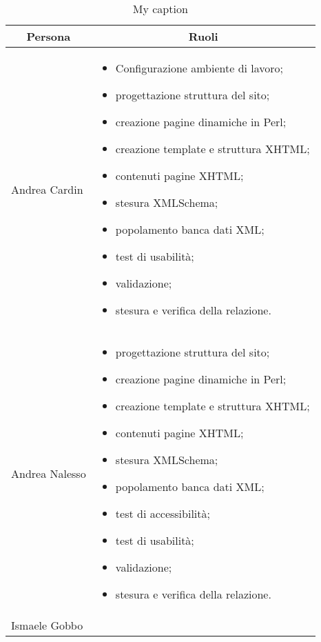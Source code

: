 \begin{table}[H]
	\centering
	\caption{My caption}
	\label{my-label}
	\begin{tabular}{|l|p{}|}
		\hline
		\multicolumn{1}{|c|}{\textbf{Persona}} & \multicolumn{1}{c|}{\textbf{Ruoli}}                   \\ \hline
\multicolumn{1}{|l|}{\rule{0pt}{4ex} Andrea Cardin}  & \multicolumn{1}{p{0.55\textwidth}|}{ \begin{itemize}
			\setlength{\itemsep}{0pt}
			\setlength{\parskip}{0pt}
			\setlength{\parsep}{0pt} 
			\item Configurazione ambiente di lavoro;
			\item progettazione struttura del sito;
			\item creazione pagine dinamiche in Perl;
			\item creazione template e struttura XHTML;
			\item contenuti pagine XHTML;
			\item stesura XMLSchema;
			\item popolamento banca dati XML;
			\item test di usabilità;
			\item validazione;
			\item stesura e verifica della relazione.
		\end{itemize} } \\ \hline
\multicolumn{1}{|l|}{\rule{0pt}{4ex} Andrea Nalesso} & \multicolumn{1}{p{0.55\textwidth}|}{
	\begin{itemize}
		\setlength{\itemsep}{0pt}
		\setlength{\parskip}{0pt}
		\setlength{\parsep}{0pt} 
		\item progettazione struttura del sito;
		\item creazione pagine dinamiche in Perl;
		\item creazione template e struttura XHTML;
		\item contenuti pagine XHTML;
		\item stesura XMLSchema;
		\item popolamento banca dati XML;
		\item test di accessibilità;
		\item test di usabilità;
		\item validazione;
		\item stesura e verifica della relazione.
	\end{itemize}} \\ \hline
	\multicolumn{1}{|l|}{\rule{0pt}{4ex} Ismaele Gobbo}  & \multicolumn{1}{p{0.55\textwidth}|}{\begin{itemize}

\end{itemize}}
\end{tabular}
\end{table}
